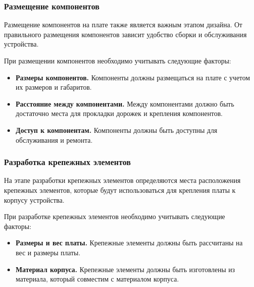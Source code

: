 \subsubsection{Размещение компонентов}
Размещение компонентов на плате также является важным этапом дизайна. От правильного размещения компонентов зависит удобство сборки и обслуживания устройства.


При размещении компонентов необходимо учитывать следующие факторы:
\begin{itemize}
    \item \textbf{Размеры компонентов.} Компоненты должны размещаться на плате с учетом их размеров и габаритов.
    \item \textbf{Расстояние между компонентами.} Между компонентами должно быть достаточно места для прокладки дорожек и крепления компонентов.
    \item \textbf{Доступ к компонентам.} Компоненты должны быть доступны для обслуживания и ремонта.
\end{itemize}

\subsubsection{Разработка крепежных элементов}
На этапе разработки крепежных элементов определяются места расположения крепежных элементов, которые будут использоваться для крепления платы к корпусу устройства.

При разработке крепежных элементов необходимо учитывать следующие факторы:

\begin{itemize}
    \item \textbf{Размеры и вес платы.} Крепежные элементы должны быть рассчитаны на вес и размеры платы.
    \item \textbf{Материал корпуса.} Крепежные элементы должны быть изготовлены из материала, который совместим с материалом корпуса.
\end{itemize}